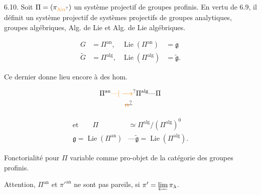 6.10. Soit $\Pi=(\pi_{\unsure{\lambda|\alpha}})$ un système projectif  de groupes profinis. En vertu de 6.9, il définit un système projectif  de systèmes projectifs  de groupes analytiques, groupes algébriques, Alg. de Lie et Alg. de Lie algébriques.

\[
\begin{aligned}
G&=\Pi^{\mathrm{an}},&\operatorname{Lie}(\Pi^{\mathrm{an}})&=\mathfrak g\\
\widetilde G&=\Pi^{\mathrm{alg}},&\operatorname{Lie}(\Pi^{\mathrm{alg}})&=\widetilde{\mathfrak g}.
\end{aligned}
\]

Ce dernier donne lieu encore à des hom.

\[
\begin{aligned}
\Pi^{\mathrm{an}}&\unsure{\text{---}|\longrightarrow}\Pi^{\mathrm{alg}}\text{---}\Pi\\
&\qquad\deleted{\unsure{\alpha}}
\end{aligned}
\]

\[
\begin{aligned}
\text{et}\qquad\Pi&\simeq\Pi^{\mathrm{alg}}/(\Pi^{\mathrm{alg}})^0\\
\mathfrak g=\operatorname{Lie}(\Pi^{\mathrm{an}})&\text{---}\widetilde{\mathfrak g}=\operatorname{Lie}(\Pi^{\mathrm{alg}}).
\end{aligned}
\]

Fonctorialité pour $\Pi$ variable comme pro-objet de la catégorie des groupes profinis.

Attention, $\Pi^{\mathrm{an}}$ et  $\pi'^{\mathrm{an}}$ ne sont pas pareils, si $\pi'=\varprojlim\pi_\lambda$.  

